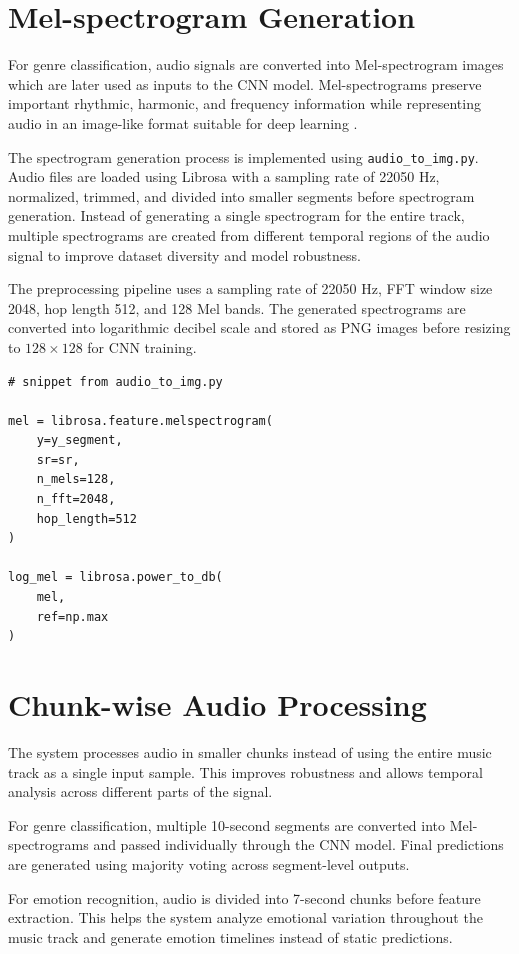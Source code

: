 \documentclass[12pt,a4paper]{report}
\begin{document}
\section{Mel-spectrogram Generation}

For genre classification, audio signals are converted into Mel-spectrogram images which are later used as inputs to the CNN model. Mel-spectrograms preserve important rhythmic, harmonic, and frequency information while representing audio in an image-like format suitable for deep learning \cite{r3,r5,r14}.

The spectrogram generation process is implemented using \texttt{audio\_to\_img.py}. Audio files are loaded using Librosa with a sampling rate of 22050 Hz, normalized, trimmed, and divided into smaller segments before spectrogram generation. Instead of generating a single spectrogram for the entire track, multiple spectrograms are created from different temporal regions of the audio signal to improve dataset diversity and model robustness.

The preprocessing pipeline uses a sampling rate of 22050 Hz, FFT window size 2048, hop length 512, and 128 Mel bands. The generated spectrograms are converted into logarithmic decibel scale and stored as PNG images before resizing to \(128 \times 128\) for CNN training.

\begin{lstlisting}
# snippet from audio_to_img.py

mel = librosa.feature.melspectrogram(
    y=y_segment,
    sr=sr,
    n_mels=128,
    n_fft=2048,
    hop_length=512
)

log_mel = librosa.power_to_db(
    mel,
    ref=np.max
)
\end{lstlisting}

\section{Chunk-wise Audio Processing}

The system processes audio in smaller chunks instead of using the entire music track as a single input sample. This improves robustness and allows temporal analysis across different parts of the signal.

For genre classification, multiple 10-second segments are converted into Mel-spectrograms and passed individually through the CNN model. Final predictions are generated using majority voting across segment-level outputs.

For emotion recognition, audio is divided into 7-second chunks before feature extraction. This helps the system analyze emotional variation throughout the music track and generate emotion timelines instead of static predictions.
\end{document}
